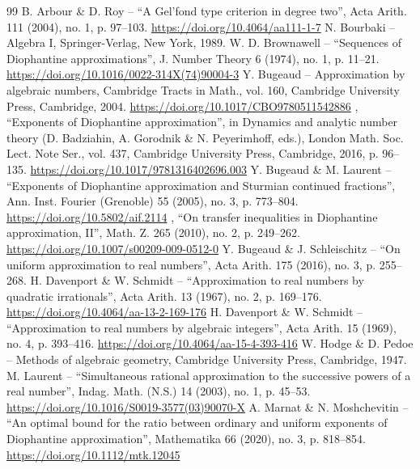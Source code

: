 \begin{thebibliography}{99}
 B. Arbour \& D. Roy – “A Gel’fond type criterion in degree two”, Acta Arith. 111 (2004), no. 1, p. 97–103. \url{https://doi.org/10.4064/aa111-1-7}
 N. Bourbaki – Algebra I, Springer-Verlag, New York, 1989. 
 W. D. Brownawell – “Sequences of Diophantine approximations”, J. Number Theory 6 (1974), no. 1, p. 11–21. \url{https://doi.org/10.1016/0022-314X(74)90004-3}
 Y. Bugeaud – Approximation by algebraic numbers, Cambridge Tracts in Math., vol. 160, Cambridge University Press, Cambridge, 2004. \url{https://doi.org/10.1017/CBO9780511542886}
 \textemdash{}, “Exponents of Diophantine approximation”, in Dynamics and analytic number theory (D. Badziahin, A. Gorodnik \& N. Peyerimhoff, eds.), London Math. Soc. Lect. Note Ser., vol. 437, Cambridge University Press, Cambridge, 2016, p. 96–135. \url{https://doi.org/10.1017/9781316402696.003}
 Y. Bugeaud \& M. Laurent – “Exponents of Diophantine approximation and Sturmian continued fractions”, Ann. Inst. Fourier (Grenoble) 55 (2005), no. 3, p. 773–804. \url{https://doi.org/10.5802/aif.2114}
 \textemdash{}, “On transfer inequalities in Diophantine approximation, II”, Math. Z. 265 (2010), no. 2, p. 249–262. \url{https://doi.org/10.1007/s00209-009-0512-0}
 Y. Bugeaud \& J. Schleischitz – “On uniform approximation to real numbers”, Acta Arith. 175 (2016), no. 3, p. 255–268.  
 H. Davenport \& W. Schmidt – “Approximation to real numbers by quadratic irrationals”, Acta Arith. 13 (1967), no. 2, p. 169–176. \url{https://doi.org/10.4064/aa-13-2-169-176}
 H. Davenport \& W. Schmidt – “Approximation to real numbers by algebraic integers”, Acta Arith. 15 (1969), no. 4, p. 393–416. \url{https://doi.org/10.4064/aa-15-4-393-416}
 W. Hodge \& D. Pedoe – Methods of algebraic geometry, Cambridge University Press, Cambridge, 1947. 
 M. Laurent – “Simultaneous rational approximation to the successive powers of a real number”, Indag. Math. (N.S.) 14 (2003), no. 1, p. 45–53. \url{https://doi.org/10.1016/S0019-3577(03)90070-X}
 A. Marnat \& N. Moshchevitin – “An optimal bound for the ratio between ordinary and uniform exponents of Diophantine approximation”, Mathematika 66 (2020), no. 3, p. 818–854. \url{https://doi.org/10.1112/mtk.12045}

\end{thebibliography}
